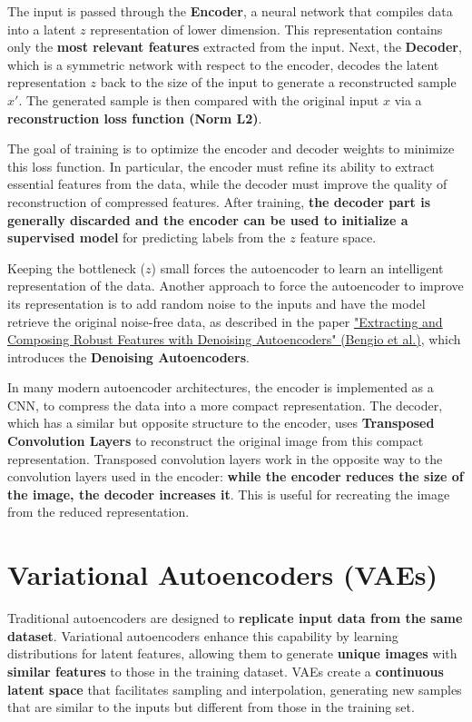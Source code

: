 The input is passed through the \textbf{Encoder}, a neural network that compiles data into a latent $z$ representation of lower dimension. This representation contains only the \textbf{most relevant features} extracted from the input. Next, the \textbf{Decoder}, which is a symmetric network with respect to the encoder, decodes the latent representation $z$ back to the size of the input to generate a reconstructed sample $x'$. The generated sample is then compared with the original input $x$ via a \textbf{reconstruction loss function (Norm L2)}.

The goal of training is to optimize the encoder and decoder weights to minimize this loss function. In particular, the encoder must refine its ability to extract essential features from the data, while the decoder must improve the quality of reconstruction of compressed features. After training, \textbf{the decoder part is generally discarded and the encoder can be used to initialize a supervised model} for predicting labels from the $z$ feature space.

Keeping the bottleneck ($z$) small forces the autoencoder to learn an intelligent representation of the data. Another approach to force the autoencoder to improve its representation is to add random noise to the inputs and have the model retrieve the original noise-free data, as described in the paper \href{https://www.cs.toronto.edu/~larocheh/publications/icml-2008-denoising-autoencoders.pdf}{"Extracting and Composing Robust Features with Denoising Autoencoders" (Bengio et al.)}, which introduces the \textbf{Denoising Autoencoders}.

In many modern autoencoder architectures, the encoder is implemented as a CNN, to compress the data into a more compact representation. The decoder, which has a similar but opposite structure to the encoder, uses \textbf{Transposed Convolution Layers} to reconstruct the original image from this compact representation. Transposed convolution layers work in the opposite way to the convolution layers used in the encoder: \textbf{while the encoder reduces the size of the image, the decoder increases it}. This is useful for recreating the image from the reduced representation.

\section{Variational Autoencoders (VAEs)}

Traditional autoencoders are designed to \textbf{replicate input data from the same dataset}. Variational autoencoders enhance this capability by learning distributions for latent features, allowing them to generate \textbf{unique images} with \textbf{similar features} to those in the training dataset. VAEs create a \textbf{continuous latent space} that facilitates sampling and interpolation, generating new samples that are similar to the inputs but different from those in the training set.

